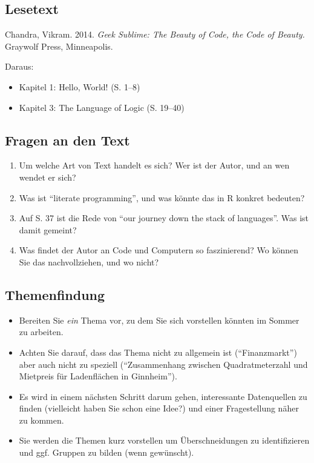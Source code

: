 \documentclass[11pt,german,a4paper]{article}
\providecommand{\tightlist}{%
  \setlength{\itemsep}{0pt}\setlength{\parskip}{0pt}}
\begin{document}
\hypertarget{lesetext-2}{%
\subsection{Lesetext}\label{lesetext-2}}

Chandra, Vikram. 2014. \emph{Geek Sublime: The Beauty of Code, the Code of Beauty.} Graywolf Press, Minneapolis.

Daraus:

\begin{itemize}
\tightlist
\item
  Kapitel 1: Hello, World! (S. 1--8)
\item
  Kapitel 3: The Language of Logic (S. 19--40)
\end{itemize}

\hypertarget{fragen-an-den-text-2}{%
\subsection{Fragen an den Text}\label{fragen-an-den-text-2}}

\begin{enumerate}
\def\labelenumi{\arabic{enumi}.}
\tightlist
\item
  Um welche Art von Text handelt es sich? Wer ist der Autor, und an wen wendet er sich?
\item
  Was ist ``literate programming'', und was könnte das in R konkret bedeuten?
\item
  Auf S. 37 ist die Rede von ``our journey down the stack of languages''. Was ist damit gemeint?
\item
  Was findet der Autor an Code und Computern so faszinierend? Wo können Sie das nachvollziehen, und wo nicht?
\end{enumerate}

\hypertarget{themenfindung}{%
\subsection{Themenfindung}\label{themenfindung}}

\begin{itemize}
\tightlist
\item
  Bereiten Sie \emph{ein} Thema vor, zu dem Sie sich vorstellen könnten im Sommer zu arbeiten.
\item
  Achten Sie darauf, dass das Thema nicht zu allgemein ist (``Finanzmarkt'') aber auch nicht zu speziell (``Zusammenhang zwischen Quadratmeterzahl und Mietpreis für Ladenflächen in Ginnheim'').
\item
  Es wird in einem nächsten Schritt darum gehen, interessante Datenquellen zu finden (vielleicht haben Sie schon eine Idee?) und einer Fragestellung näher zu kommen.
\item
  Sie werden die Themen kurz vorstellen um Überschneidungen zu identifizieren und ggf. Gruppen zu bilden (wenn gewünscht).
\end{itemize}
\end{document}
